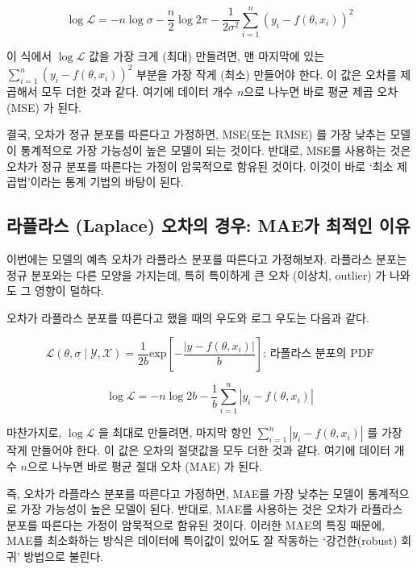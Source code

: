 \documentclass{article}
\newcommand{\abs}[1]{\left|#1\right|}
\begin{document}
\begin{equation}
  \log\mathcal{L} = -n\log{\sigma} -\frac{n}{2}\log{2\pi} - \frac{1}{2\sigma^2}\sum_{i=1}^n(y_i-f(\theta, x_i))^2
\end{equation}

이 식에서 $\log \mathcal{L}$ 값을 가장 크게 (최대) 만들려면, 맨 마지막에 있는 $\sum_{i=1}^n(y_i-f(\theta, x_i))^2$ 부분을 가장 작게 (최소) 만들어야 한다. 이 값은 오차를 제곱해서 모두 더한 것과 같다. 여기에 데이터 개수 $n$으로 나누면 바로 평균 제곱 오차 (MSE) 가 된다.

결국, 오차가 정규 분포를 따른다고 가정하면, MSE(또는 RMSE) 를 가장 낮추는 모델이 통계적으로 가장 가능성이 높은 모델이 되는 것이다. 반대로, MSE를 사용하는 것은 오차가 정규 분포를 따른다는 가정이 암묵적으로 함유된 것이다. 이것이 바로 `최소 제곱법'이라는 통계 기법의 바탕이 된다.

\subsection{라플라스 (Laplace) 오차의 경우: MAE가 최적인 이유}
\label{subsec:laplace}
이번에는 모델의 예측 오차가 라플라스 분포를 따른다고 가정해보자. 라플라스 분포는 정규 분포와는 다른 모양을 가지는데, 특히 특이하게 큰 오차 (이상치, outlier) 가 나와도 그 영향이 덜하다.

오차가 라플라스 분포를 따른다고 했을 때의 우도와 로그 우도는 다음과 같다.

\begin{equation}
  \mathcal{L}(\theta, \sigma \mid \mathcal{Y}, \mathcal{X}) = \frac{1}{2b}\text{exp}\left[-\frac{\abs{y-f(\theta, x_i)}}{b}\right]\text{: 라폴라스 분포의 PDF}
\end{equation}

\begin{equation}
  \log\mathcal{L} = -n\log{2b} - \frac{1}{b}\sum_{i=1}^n\abs{y_i-f(\theta, x_i)}
\end{equation}

마찬가지로, $\log \mathcal{L}$ 을 최대로 만들려면, 마지막 항인 $\sum_{i=1}^n\abs{y_i-f(\theta, x_i)}$ 를 가장 작게 만들어야 한다. 이 값은 오차의 절댓값을 모두 더한 것과 같다. 여기에 데이터 개수 $n$으로 나누면 바로 평균 절대 오차 (MAE) 가 된다.

즉, 오차가 라플라스 분포를 따른다고 가정하면, MAE를 가장 낮추는 모델이 통계적으로 가장 가능성이 높은 모델이 된다. 반대로, MAE를 사용하는 것은 오차가 라플라스 분포를 따른다는 가정이 암묵적으로 함유된 것이다. 이러한 MAE의 특징 때문에, MAE를 최소화하는 방식은 데이터에 특이값이 있어도 잘 작동하는 `강건한(robust) 회귀' 방법으로 불린다.
\end{document}
